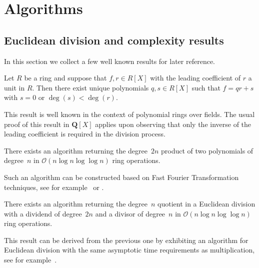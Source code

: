 
\chapter{Algorithms}
\label{ch:02-Algorithms}


\section{Euclidean division and complexity results}
\label{sec:EuclideanDivision}

In this section we collect a few well known results for later 
reference.

\begin{prop}
Let $R$ be a ring and suppose that $f, r \in R[X]$ with the 
leading coefficient of $r$ a unit in $R$.  Then there exist 
unique polynomials $q, s \in R[X]$ such that $f = q r + s$ 
with $s = 0$ or $\deg(s) < \deg(r)$.
\end{prop}

This result is well known in the context of polynomial rings 
over fields.  The usual proof of this result in $\mathbf{Q}[X]$ 
applies upon observing that only the inverse of the leading 
coefficient is required in the division process.

\begin{prop} \label{prop:mul}
There exists an algorithm returning the degree~$2n$ product of two 
polynomials of degree~$n$ in $\mathcal{O}(n \log n \log \log n)$ 
ring operations.
\end{prop}

Such an algorithm can be constructed based on Fast Fourier Transformation 
techniques, see for example~\citep[\S Theorem~8.23]{GathenGerhard2003} or 
\citep[\S 4]{Bernstein2008}.

\begin{prop} \label{prop:div1}
There exists an algorithm returning the degree~$n$ quotient 
in a Euclidean division with a dividend of degree~$2n$ 
and a divisor of degree~$n$ in $\mathcal{O}(n \log n \log \log n)$ 
ring operations.
\end{prop}

This result can be derived from the previous one by exhibiting an algorithm 
for Euclidean division with the same asymptotic time requirements as 
multiplication, see for example~\citep[\S 17]{Bernstein2008}.

